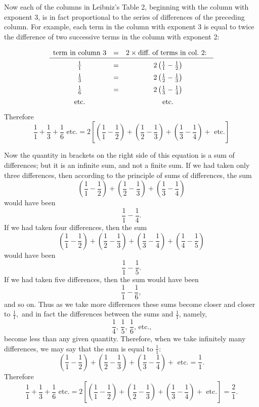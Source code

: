 \documentclass[polutonikogreek,english,twoside,openright]{article}
\begin{document}
Now each of the columns in Leibniz's Table 2, beginning with the column with exponent 3, is in fact proportional to the series of differences of the preceding column.  For example, each term in the column with exponent 3 is equal to twice the difference of two successive terms in the column with exponent 2:
$$\begin{array}{ccc}
\rule[-1ex]{0ex}{4ex}\mbox{term in column 3} &  = & 2\times \mbox{diff.\ of terms in col.\ 2: }\\ \hline
\rule[-1ex]{0ex}{4ex}\frac{1}{1}  & = &  2\left(\frac{1}{1}- \frac{1}{2}\right)  \\
\rule[-1ex]{0ex}{4ex}\frac{1}{3}  & = &  2\left(\frac{1}{2}- \frac{1}{3}\right) \\
\rule[-1ex]{0ex}{4ex}\frac{1}{6}  & = &  2\left(\frac{1}{3}- \frac{1}{4}\right) \\
\rule[-1ex]{0ex}{4ex}\mbox{etc.} & & \mbox{etc.}
\end{array}$$
 Therefore
$$\frac{1}{1} + \frac{1}{3} + \frac{1}{6} \mbox{ etc.} = 2\left[\left(\frac{1}{1} - \frac{1}{2}\right) + \left(\frac{1}{2} - \frac{1}{3}\right) + \left(\frac{1}{3} -\frac{1}{4}\right) + \mbox{ etc.}\right]$$

Now the quantity in brackets on the right side of this equation is a sum of differences; but it is an infinite sum, and not a finite sum.    If we had taken only three differences, then according to the principle of sums of differences, the sum
 $$\left(\frac{1}{1} - \frac{1}{2}\right) + \left(\frac{1}{2} - \frac{1}{3}\right) + \left(\frac{1}{3} -\frac{1}{4}\right)$$
 would have been
 $$\frac{1}{1} - \frac{1}{4}.$$
 If we had taken four differences, then the sum
 $$\left(\frac{1}{1} - \frac{1}{2}\right) + \left(\frac{1}{2} - \frac{1}{3}\right) + \left(\frac{1}{3} -\frac{1}{4}\right) + \left(\frac{1}{4} - \frac{1}{5}\right)$$
 would have been
 $$\frac{1}{1} -\frac{1}{5}.$$
 If we had taken five differences, then the sum would have been 
 $$\frac{1}{1} - \frac{1}{6},$$
 and so on.  Thus as we take more differences these sums become closer and closer to 
 $\frac{1}{1},$
 and in fact the differences  between the sums and $\frac{1}{1}$, namely,
 $$\frac{1}{4}\mbox{, }\frac{1}{5}\mbox{, }\frac{1}{6} \mbox{, etc.,}$$
 become less than any given quantity. Therefore, when we take infinitely many differences, we may say that the sum is equal to $\frac{1}{1}$:
 $$ \left(\frac{1}{1} - \frac{1}{2}\right) + \left(\frac{1}{2} - \frac{1}{3}\right) + \left(\frac{1}{3} -\frac{1}{4}\right) +\mbox{ etc.} = \frac{1}{1}.$$
  Therefore
$$\frac{1}{1} + \frac{1}{3} + \frac{1}{6} \mbox{ etc.}= 2\left[\left(\frac{1}{1} - \frac{1}{2}\right) + \left(\frac{1}{2} - \frac{1}{3}\right) + \left(\frac{1}{3} -\frac{1}{4}\right) + \mbox{ etc.}\right]= \frac{2}{1}.$$\label{endsersum}
\end{document}
